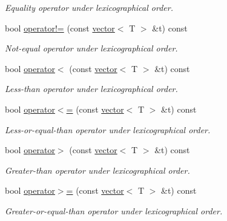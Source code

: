 \begin{DoxyCompactItemize}
\begin{DoxyCompactList}\small\item\em Equality operator under lexicographical order. \end{DoxyCompactList}\item 
\hypertarget{classmerlin_1_1vector_a94d39609027858a133eea259ea1818ce}{}bool \hyperlink{classmerlin_1_1vector_a94d39609027858a133eea259ea1818ce}{operator!=} (const \hyperlink{classmerlin_1_1vector}{vector}$<$ T $>$ \&t) const \label{classmerlin_1_1vector_a94d39609027858a133eea259ea1818ce}

\begin{DoxyCompactList}\small\item\em Not-\/equal operator under lexicographical order. \end{DoxyCompactList}\item 
\hypertarget{classmerlin_1_1vector_a183cae0303276e9c310ce383fa67a126}{}bool \hyperlink{classmerlin_1_1vector_a183cae0303276e9c310ce383fa67a126}{operator$<$} (const \hyperlink{classmerlin_1_1vector}{vector}$<$ T $>$ \&t) const \label{classmerlin_1_1vector_a183cae0303276e9c310ce383fa67a126}

\begin{DoxyCompactList}\small\item\em Less-\/than operator under lexicographical order. \end{DoxyCompactList}\item 
\hypertarget{classmerlin_1_1vector_a0bf2c3e70321a5ed17036762513afebd}{}bool \hyperlink{classmerlin_1_1vector_a0bf2c3e70321a5ed17036762513afebd}{operator$<$=} (const \hyperlink{classmerlin_1_1vector}{vector}$<$ T $>$ \&t) const \label{classmerlin_1_1vector_a0bf2c3e70321a5ed17036762513afebd}

\begin{DoxyCompactList}\small\item\em Less-\/or-\/equal-\/than operator under lexicographical order. \end{DoxyCompactList}\item 
\hypertarget{classmerlin_1_1vector_a064996c92138178f03fd9147cd382122}{}bool \hyperlink{classmerlin_1_1vector_a064996c92138178f03fd9147cd382122}{operator$>$} (const \hyperlink{classmerlin_1_1vector}{vector}$<$ T $>$ \&t) const \label{classmerlin_1_1vector_a064996c92138178f03fd9147cd382122}

\begin{DoxyCompactList}\small\item\em Greater-\/than operator under lexicographical order. \end{DoxyCompactList}\item 
\hypertarget{classmerlin_1_1vector_a83dbba1136d7ed0af355b01b89de8d65}{}bool \hyperlink{classmerlin_1_1vector_a83dbba1136d7ed0af355b01b89de8d65}{operator$>$=} (const \hyperlink{classmerlin_1_1vector}{vector}$<$ T $>$ \&t) const \label{classmerlin_1_1vector_a83dbba1136d7ed0af355b01b89de8d65}

\begin{DoxyCompactList}\small\item\em Greater-\/or-\/equal-\/than operator under lexicographical order. \end{DoxyCompactList}\end{DoxyCompactItemize}
